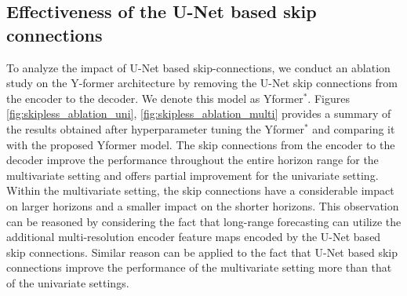 \subsection{Effectiveness of the U-Net based skip connections}

To analyze the impact of U-Net based skip-connections, we conduct an ablation study on the Y-former architecture by removing the U-Net skip connections from the encoder to the decoder. We denote this model as Yformer$^*$. Figures \ref{fig:skipless_ablation_uni}, \ref{fig:skipless_ablation_multi} provides a summary of the results obtained after hyperparameter tuning the Yformer$^*$ and comparing it with the proposed Yformer model. The skip connections from the encoder to the decoder improve the performance throughout the entire horizon range for the multivariate setting and offers partial improvement for the univariate setting. Within the multivariate setting, the skip connections have a considerable impact on larger horizons and a smaller impact on the shorter horizons. This observation can be reasoned by considering the fact that long-range forecasting can utilize the additional multi-resolution encoder feature maps encoded by the U-Net based skip connections. Similar reason can be applied to the fact that U-Net based skip connections improve the performance of the multivariate setting more than that of the univariate settings.

